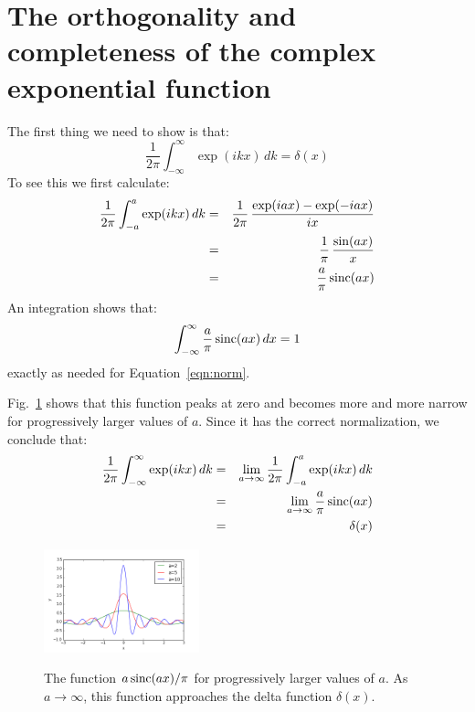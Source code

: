 \documentclass[12pt,oneside]{book}
\begin{document}
\section{The orthogonality and completeness of the complex exponential function}

The first thing we need to show is that:
\begin{equation}
\frac{1}{2\pi} \int_{-\infty}^{\infty} \exp(ikx) \, dk = \delta(x)
\end{equation}
To see this we first calculate:
\begin{eqnarray*} 
\frac{1}{2\pi} \int_{-a}^{a} \exp(ikx) \, dk &=& \frac{1}{2\pi} \, \frac{\exp(iax)-\exp(-iax)}{ix}\\
&=& \frac{1}{\pi} \, \frac{\sin(ax)}{x} \\
&=& \frac{a}{\pi} \, {\rm sinc}(ax)
\end{eqnarray*}
An integration shows that:
\begin{eqnarray}
\int_{-\infty}^{\infty} \frac{a}{\pi} \, {\rm sinc}(ax) \, dx = 1
\end{eqnarray}
exactly as needed for Equation~\ref{eqn:norm}.

Fig.~\ref{fig:sinc} shows that this function peaks at zero and becomes more and more narrow for progressively larger values of $a$.  Since it has the correct normalization, we conclude that:
\begin{eqnarray}
\frac{1}{2\pi} \int_{-\infty}^{\infty} \exp(ikx) \, dk &=& \lim_{a\to\infty} \frac{1}{2\pi} \int_{-a}^{a} \exp(ikx) \, dk \nonumber \\
&=& \lim_{a\to\infty} \frac{a}{\pi} \, {\rm sinc}(ax) \nonumber \\ 
&=& \delta(x) \label{eqn:delta}
\end{eqnarray}

\begin{figure}[thb]
\begin{center}
{\includegraphics[width=0.40\textwidth]{figs/sinc.png}}
\end{center}
\caption{\label{fig:sinc} The function $a \, {\rm sinc}(ax)/\pi$ for progressively larger values of $a$.  As $a \to \infty$, this function approaches the delta function $\delta(x)$.}
\end{figure}
\end{document}
